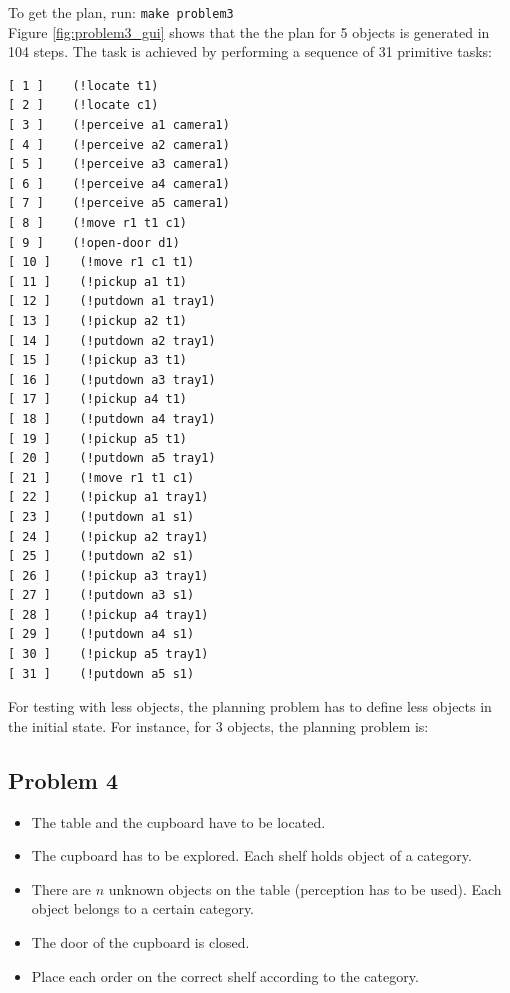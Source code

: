 \documentclass[paper=a4, fontsize=11pt]{scrartcl}
\begin{document}
	To get the plan, run: \verb|make problem3| \\
	
	Figure \ref{fig:problem3_gui} shows that the the plan for 5 objects is generated in 104 steps. The task is achieved by performing a sequence of 31 primitive tasks: \\
	
	\begin{lstlisting}
[ 1 ]    (!locate t1)
[ 2 ]    (!locate c1)
[ 3 ]    (!perceive a1 camera1)
[ 4 ]    (!perceive a2 camera1)
[ 5 ]    (!perceive a3 camera1)
[ 6 ]    (!perceive a4 camera1)
[ 7 ]    (!perceive a5 camera1)
[ 8 ]    (!move r1 t1 c1)
[ 9 ]    (!open-door d1)
[ 10 ]    (!move r1 c1 t1)
[ 11 ]    (!pickup a1 t1)
[ 12 ]    (!putdown a1 tray1)
[ 13 ]    (!pickup a2 t1)
[ 14 ]    (!putdown a2 tray1)
[ 15 ]    (!pickup a3 t1)
[ 16 ]    (!putdown a3 tray1)
[ 17 ]    (!pickup a4 t1)
[ 18 ]    (!putdown a4 tray1)
[ 19 ]    (!pickup a5 t1)
[ 20 ]    (!putdown a5 tray1)
[ 21 ]    (!move r1 t1 c1)
[ 22 ]    (!pickup a1 tray1)
[ 23 ]    (!putdown a1 s1)
[ 24 ]    (!pickup a2 tray1)
[ 25 ]    (!putdown a2 s1)
[ 26 ]    (!pickup a3 tray1)
[ 27 ]    (!putdown a3 s1)
[ 28 ]    (!pickup a4 tray1)
[ 29 ]    (!putdown a4 s1)
[ 30 ]    (!pickup a5 tray1)
[ 31 ]    (!putdown a5 s1)
	\end{lstlisting}
	
For testing with less objects, the planning problem has to define less objects in the initial state. For instance, for 3 objects, the planning problem is: 

		
	
	\subsection{Problem 4}
	
		\begin{itemize}
			\item The table and the cupboard have to be located.
			\item The cupboard has to be explored. Each shelf holds object of a category.
			\item There are $n$ unknown objects on the table (perception has to be used). Each object belongs to a certain category.
			\item The door of the cupboard is closed.
			\item Place each order on the correct shelf according to the category.
		\end{itemize}
	
\end{document}

